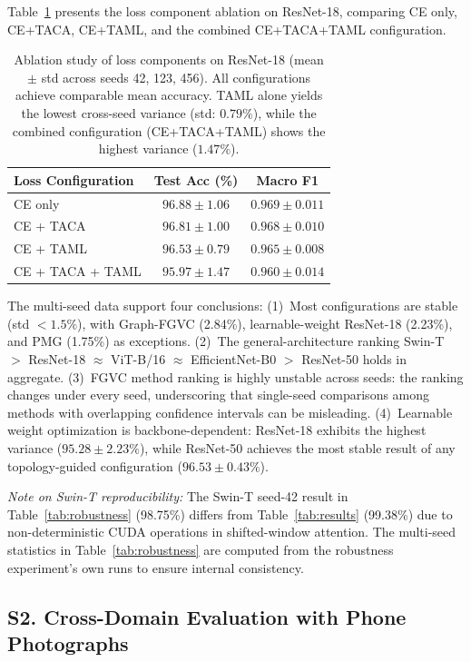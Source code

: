 \documentclass[preprint,review,12pt]{elsarticle}
\begin{document}
Table~\ref{tab:loss_ablation} presents the loss component ablation on ResNet-18, comparing CE only, CE+TACA, CE+TAML, and the combined CE+TACA+TAML configuration.

\begin{table}[htbp]
\centering
\caption{Ablation study of loss components on ResNet-18 (mean $\pm$ std across seeds 42, 123, 456). All configurations achieve comparable mean accuracy. TAML alone yields the lowest cross-seed variance (std: $0.79\%$), while the combined configuration (CE+TACA+TAML) shows the highest variance ($1.47\%$).}
\label{tab:loss_ablation}
\small
\begin{tabular}{@{}lcc@{}}
\toprule
Loss Configuration & Test Acc (\%) & Macro F1 \\
\midrule
CE only & $96.88 \pm 1.06$ & $0.969 \pm 0.011$ \\
CE + TACA & $96.81 \pm 1.00$ & $0.968 \pm 0.010$ \\
CE + TAML & $96.53 \pm \mathbf{0.79}$ & $0.965 \pm 0.008$ \\
CE + TACA + TAML & $95.97 \pm 1.47$ & $0.960 \pm 0.014$ \\
\bottomrule
\end{tabular}
\end{table}

The multi-seed data support four conclusions: (1)~Most configurations are stable (std $< 1.5\%$), with Graph-FGVC (2.84\%), learnable-weight ResNet-18 (2.23\%), and PMG (1.75\%) as exceptions. (2)~The general-architecture ranking Swin-T $>$ ResNet-18 $\approx$ ViT-B/16 $\approx$ EfficientNet-B0 $>$ ResNet-50 holds in aggregate. (3)~FGVC method ranking is highly unstable across seeds: the ranking changes under every seed, underscoring that single-seed comparisons among methods with overlapping confidence intervals can be misleading. (4)~Learnable weight optimization is backbone-dependent: ResNet-18 exhibits the highest variance ($95.28 \pm 2.23\%$), while ResNet-50 achieves the most stable result of any topology-guided configuration ($96.53 \pm 0.43\%$).

\emph{Note on Swin-T reproducibility:} The Swin-T seed-42 result in Table~\ref{tab:robustness} (98.75\%) differs from Table~\ref{tab:results} (99.38\%) due to non-deterministic CUDA operations in shifted-window attention. The multi-seed statistics in Table~\ref{tab:robustness} are computed from the robustness experiment's own runs to ensure internal consistency.

\subsection*{S2. Cross-Domain Evaluation with Phone Photographs}\label{sec:supp_crossdomain}
\end{document}
